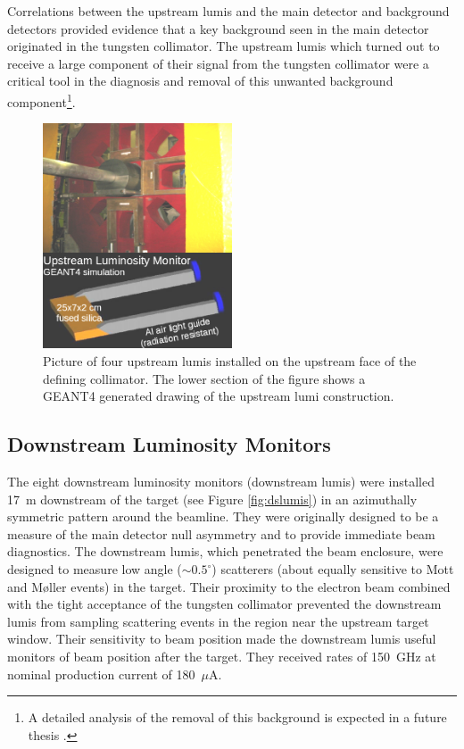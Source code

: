 Correlations between the upstream lumis and the main detector and background detectors provided evidence that a key background seen in the main detector originated in the tungsten collimator. The upstream lumis which turned out to receive a large component of their signal from the tungsten collimator were a critical tool in the diagnosis and removal of this unwanted background component\footnote{A detailed analysis of the removal of this background is expected in a future thesis \cite{Kargiantoulakis}.}. 
\begin{figure}[ht]
\centering
\includegraphics[width=0.5\textwidth]{Pictures/uslumis.png}
\caption{Picture of four upstream lumis installed on the upstream face of the defining collimator. The lower section of the figure shows a GEANT4 generated drawing of the upstream lumi construction.}
\label{fig:uslumis}
\end{figure}

\subsection{Downstream Luminosity Monitors}
The eight downstream luminosity monitors (downstream lumis) were installed 17~m downstream of the target (see Figure \ref{fig:dslumis}) in an azimuthally symmetric pattern around the beamline. They were originally designed to be a measure of the main detector null asymmetry and to provide immediate beam diagnostics. The downstream lumis, which penetrated the beam enclosure, were designed to measure low angle ($\sim 0.5^{\circ}$) scatterers (about equally sensitive to Mott and M\o ller events) in the target. Their proximity to the electron beam combined with the tight acceptance of the tungsten collimator prevented the downstream lumis from sampling scattering events in the region near the upstream target window. Their sensitivity to beam position made the downstream lumis useful monitors of beam position after the target. They received rates of 150~GHz at nominal production current of 180~$\mu$A.

